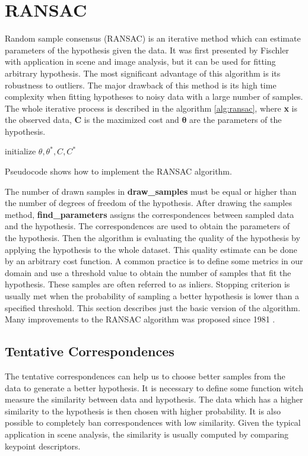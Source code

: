 \section{RANSAC}
Random sample consensus (RANSAC) is an iterative method which can estimate parameters of the hypothesis given the data. It was first presented by Fischler \cite{fischler1981} with application in scene and image analysis, but it can be used for fitting arbitrary hypothesis. The most significant advantage of this algorithm is its robustness to outliers. The major drawback of this method is its high time complexity when fitting hypotheses to noisy data with a large number of samples. The whole iterative process is described in the algorithm \ref{alg:ransac}, where \textbf{x} is the observed data, \textbf{C} is the maximized cost and $\bm{\theta}$ are the parameters of the hypothesis.
\begin{algorithm}[]
 initialize $\theta, \theta^*, C, C^*$\;
 \caption{Pseudocode shows how to implement the RANSAC algorithm.}
 \label{alg:ransac}
\end{algorithm}

The number of drawn samples in \textbf{draw\_samples} must be equal or higher than the number of degrees of freedom of the hypothesis. After drawing the samples method, \textbf{find\_parameters} assigns the correspondences between sampled data and the hypothesis. The correspondences are used to obtain the parameters of the hypothesis. Then the algorithm is evaluating the quality of the hypothesis by applying the hypothesis to the whole dataset. This quality estimate can be done by an arbitrary cost function. A common practice is to define some metrics in our domain and use a threshold value to obtain the number of samples that fit the hypothesis. These samples are often referred to as inliers. Stopping criterion is usually met when the probability of sampling a better hypothesis is lower than a specified threshold. This section describes just the basic version of the algorithm. Many improvements to the RANSAC algorithm was proposed since 1981 \cite{chum2008}.

\subsection{Tentative Correspondences}
The tentative correspondences can help us to choose better samples from the data to generate a better hypothesis. It is necessary to define some function witch measure the similarity between data and hypothesis. The data which has a higher similarity to the hypothesis is then chosen with higher probability. It is also possible to completely ban correspondences with low similarity. Given the typical application in scene analysis, the similarity is usually computed by comparing keypoint descriptors.

